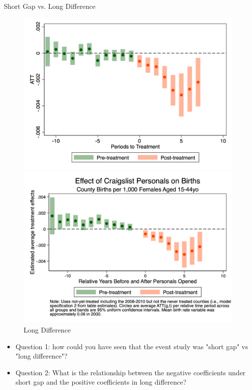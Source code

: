 \documentclass{beamer}
\begin{document}
\begin{frame}{Short Gap vs. Long Difference}

\begin{figure}[htbp]
    \centering
    \begin{minipage}[b]{0.48\textwidth}
        \centering
        \includegraphics[width=\textwidth,height=0.75\textheight,keepaspectratio]{./lecture_includes/es_br1544_shortgap.png}
        \caption{Short Gap}
    \end{minipage}
    \hfill
    \begin{minipage}[b]{0.48\textwidth}
        \centering
        \includegraphics[width=\textwidth,height=0.75\textheight,keepaspectratio]{./lecture_includes/es_births2.png}
        \caption{Long Difference}
    \end{minipage}
\end{figure}

\pause

\begin{itemize}
\item Question 1: how could you have seen that the event study was "short gap" vs "long difference"? \pause
\item Question 2: What is the relationship between the negative coefficients under short gap and the positive coefficients in long difference?
\end{itemize}

\end{frame}
\end{document}
